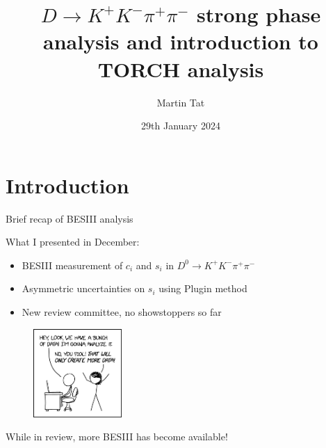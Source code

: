 \documentclass{beamer}
\title[$K^+K^-\pi^+\pi^-$]{\texorpdfstring{$D\to K^+K^-\pi^+\pi^-$}{K+K-pi+pi-} strong phase analysis and introduction to TORCH analysis}
\author{Martin Tat}
\institute{Oxford LHCb}
\date{29th January 2024}
\begin{document}
\begin{frame}
  \titlepage
\end{frame}


\section{Introduction}

\begin{frame}{Brief recap of BESIII analysis}
  \begin{center}
    \Large{What I presented in December:}
  \end{center}
  \vspace{0.1cm}
  \begin{itemize}
    \setlength\itemsep{0.7em}
    \item{BESIII measurement of $c_i$ and $s_i$ in $D^0\to K^+K^-\pi^+\pi^-$}
    \item{Asymmetric uncertainties on $s_i$ using Plugin method}
    \item{New review committee, no showstoppers so far}
  \end{itemize}
  \begin{figure}
    \centering
    \includegraphics[width = 0.3\textwidth]{Plots/XKCD_Data_Trap.png}
  \end{figure}
  \begin{center}
    \Large{While in review, more BESIII has become available!}
  \end{center}
\end{frame}
\end{document}
